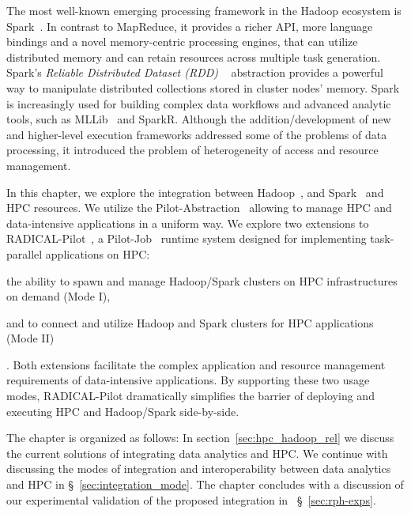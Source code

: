 The most well-known emerging processing framework in the Hadoop ecosystem is Spark~\cite{zaharia2010spark}.
In contrast to MapReduce, it provides a richer API, more language bindings and a novel memory-centric processing engines, that can utilize distributed memory and can retain resources across multiple task generation.
Spark's \emph{Reliable Distributed Dataset (RDD)} ~\cite{zaharia2012resilient} abstraction provides a powerful way to manipulate distributed collections stored in cluster nodes' memory.
Spark is increasingly used for building complex data workflows and advanced analytic tools, such as MLLib~\cite{mllib} and SparkR.
Although the addition/development of new and higher-level execution frameworks addressed some of the problems of data processing, it introduced the problem of heterogeneity of access and resource management.

In this chapter, we explore the integration between Hadoop~\cite{hadoop}, and Spark~\cite{zaharia2010spark} and HPC resources.
We utilize the Pilot-Abstraction~\cite{luckow2012pstar} allowing to manage HPC and data-intensive applications in a uniform way.
We explore two extensions to RADICAL-Pilot~\cite{merzky2018design}, a Pilot-Job~\cite{luckow2012pstar} runtime system designed for implementing task-parallel applications on HPC: 
\begin{inparaenum}[(i)]
    \item the ability to spawn and manage Hadoop/Spark clusters on HPC infrastructures on demand (Mode I),
    \item and to connect and utilize Hadoop and Spark clusters for HPC applications (Mode II)
\end{inparaenum}.
Both extensions facilitate the complex application and resource management requirements of data-intensive applications.
By supporting these two usage modes, RADICAL-Pilot dramatically simplifies the barrier of deploying and executing HPC and Hadoop/Spark side-by-side.

The chapter is organized as follows: In section~\ref{sec:hpc_hadoop_rel} we discuss the current solutions of integrating data analytics and HPC.
We continue with discussing the modes of integration and interoperability between data analytics and HPC in \S~\ref{sec:integration_mode}.
The chapter concludes with a discussion of our experimental validation of the proposed integration in ~\S~\ref{sec:rph-exps}.

